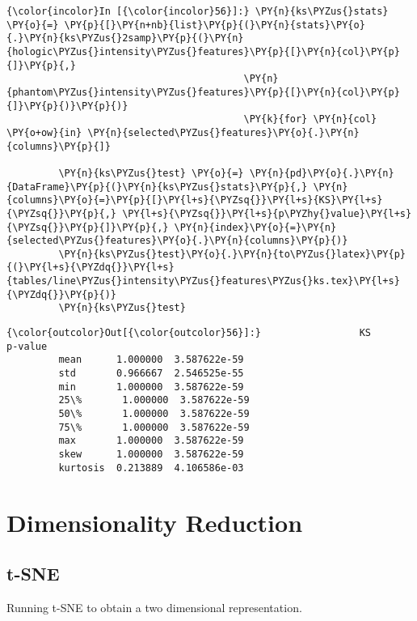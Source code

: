     \begin{Verbatim}[commandchars=\\\{\}]
{\color{incolor}In [{\color{incolor}56}]:} \PY{n}{ks\PYZus{}stats} \PY{o}{=} \PY{p}{[}\PY{n+nb}{list}\PY{p}{(}\PY{n}{stats}\PY{o}{.}\PY{n}{ks\PYZus{}2samp}\PY{p}{(}\PY{n}{hologic\PYZus{}intensity\PYZus{}features}\PY{p}{[}\PY{n}{col}\PY{p}{]}\PY{p}{,}
                                         \PY{n}{phantom\PYZus{}intensity\PYZus{}features}\PY{p}{[}\PY{n}{col}\PY{p}{]}\PY{p}{)}\PY{p}{)}
                                         \PY{k}{for} \PY{n}{col} \PY{o+ow}{in} \PY{n}{selected\PYZus{}features}\PY{o}{.}\PY{n}{columns}\PY{p}{]}

         \PY{n}{ks\PYZus{}test} \PY{o}{=} \PY{n}{pd}\PY{o}{.}\PY{n}{DataFrame}\PY{p}{(}\PY{n}{ks\PYZus{}stats}\PY{p}{,} \PY{n}{columns}\PY{o}{=}\PY{p}{[}\PY{l+s}{\PYZsq{}}\PY{l+s}{KS}\PY{l+s}{\PYZsq{}}\PY{p}{,} \PY{l+s}{\PYZsq{}}\PY{l+s}{p\PYZhy{}value}\PY{l+s}{\PYZsq{}}\PY{p}{]}\PY{p}{,} \PY{n}{index}\PY{o}{=}\PY{n}{selected\PYZus{}features}\PY{o}{.}\PY{n}{columns}\PY{p}{)}
         \PY{n}{ks\PYZus{}test}\PY{o}{.}\PY{n}{to\PYZus{}latex}\PY{p}{(}\PY{l+s}{\PYZdq{}}\PY{l+s}{tables/line\PYZus{}intensity\PYZus{}features\PYZus{}ks.tex}\PY{l+s}{\PYZdq{}}\PY{p}{)}
         \PY{n}{ks\PYZus{}test}
\end{Verbatim}

            \begin{Verbatim}[commandchars=\\\{\}]
{\color{outcolor}Out[{\color{outcolor}56}]:}                 KS       p-value
         mean      1.000000  3.587622e-59
         std       0.966667  2.546525e-55
         min       1.000000  3.587622e-59
         25\%       1.000000  3.587622e-59
         50\%       1.000000  3.587622e-59
         75\%       1.000000  3.587622e-59
         max       1.000000  3.587622e-59
         skew      1.000000  3.587622e-59
         kurtosis  0.213889  4.106586e-03
\end{Verbatim}

    \section{Dimensionality Reduction}\label{dimensionality-reduction}

\subsection{t-SNE}\label{t-sne}

Running t-SNE to obtain a two dimensional representation.

